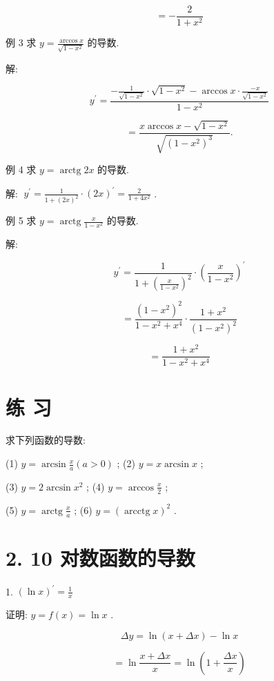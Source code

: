 \documentclass[10pt]{article}
\begin{document}
\[
= - \frac{2}{1 + {x}^{2}}
\]

例 3 求 \(y = \frac{\arccos x}{\sqrt{1 - {x}^{2}}}\) 的导数.

解:

\[
{y}^{\prime } = \frac{-\frac{1}{\sqrt{1 - {x}^{2}}} \cdot \sqrt{1 - {x}^{2}} - \arccos x \cdot \frac{-x}{\sqrt{1 - {x}^{2}}}}{1 - {x}^{2}}
\]

\[
= \frac{x\arccos x - \sqrt{1 - {x}^{2}}}{\sqrt{{\left( 1 - {x}^{2}\right) }^{3}}}.
\]

例 4 求 \(y = \operatorname{arctg}{2x}\) 的导数.

解: \(\;{y}^{\prime } = \frac{1}{1 + {\left( 2x\right) }^{2}} \cdot {\left( 2x\right) }^{\prime } = \frac{2}{1 + 4{x}^{2}}\) .

例 5 求 \(y = \operatorname{arctg}\frac{x}{1 - {x}^{2}}\) 的导数.

解:

\[
{y}^{\prime } = \frac{1}{1 + {\left( \frac{x}{1 - {x}^{2}}\right) }^{2}} \cdot {\left( \frac{x}{1 - {x}^{2}}\right) }^{\prime }
\]

\[
= \frac{{\left( 1 - {x}^{2}\right) }^{2}}{1 - {x}^{2} + {x}^{4}} \cdot \frac{1 + {x}^{2}}{{\left( 1 - {x}^{2}\right) }^{2}}
\]

\[
= \frac{1 + {x}^{2}}{1 - {x}^{2} + {x}^{4}}
\]

\section*{练 习}

求下列函数的导数:

(1) \(y = \arcsin \frac{x}{a}\left( {a > 0}\right)\) ; (2) \(y = x\arcsin x\) ;

(3) \(y = 2\arcsin {x}^{2}\) ; (4) \(y = \arccos \frac{x}{2}\) ;

(5) \(y = \operatorname{arctg}\frac{x}{a}\) ; (6) \(y = {\left( \operatorname{arcctg}x\right) }^{2}\) .

\section*{2. 10 对数函数的导数}

1. \({\left( \ln x\right) }^{\prime } = \frac{1}{x}\)

证明: \(y = f\left( x\right) = \ln x\) .

\[
{\Delta y} = \ln \left( {x + {\Delta x}}\right) - \ln x
\]

\[
= \ln \frac{x + {\Delta x}}{x} = \ln \left( {1 + \frac{\Delta x}{x}}\right)
\]
\end{document}
